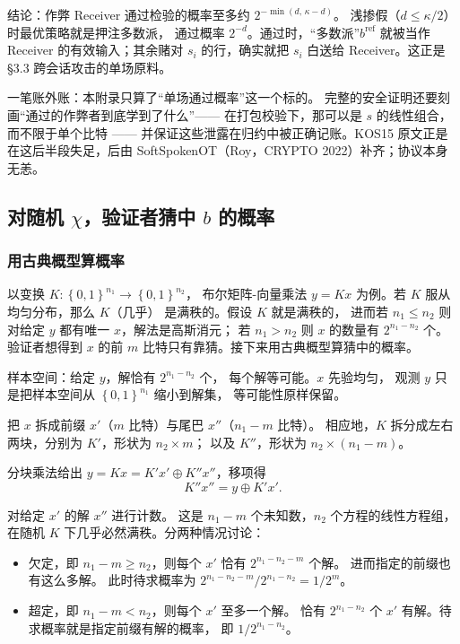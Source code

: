 结论：作弊 Receiver 通过检验的概率至多约 $2^{-\min(d,\,\kappa-d)}$。
浅掺假（$d \le \kappa/2$）时最优策略就是押注多数派，
通过概率 $2^{-d}$。通过时，“多数派”$b^{\mathrm{ref}}$ 就被当作
Receiver 的有效输入；其余赌对 $s_i$ 的行，确实就把 $s_i$ 白送给
Receiver。这正是 §3.3 跨会话攻击的单场原料。

一笔账外账：本附录只算了“单场通过概率”这一个标的。
完整的安全证明还要刻画“通过的作弊者到底学到了什么”------
在打包校验下，那可以是 $s$ 的线性组合，而不限于单个比特 ------
并保证这些泄露在归约中被正确记账。KOS15 原文正是在这后半段失足，后由
SoftSpokenOT（Roy，CRYPTO 2022）补齐；协议本身无恙。

\subsection{\texorpdfstring{对随机 $\chi$，验证者猜中 $b$ 的概率}{对随机\textbackslash chi，验证者猜中b的概率}}
\subsubsection{用古典概型算概率}

以变换 $K: \left\{0,1\right\}^{n_1} \rightarrow \left\{0,1\right\}^{n_2}$，
布尔矩阵-向量乘法 $y=Kx$ 为例。若 $K$ 服从均匀分布，那么 $K$（几乎）
是满秩的。假设 $K$ 就是满秩的，
进而若 $n_1\le n_2$ 则对给定 $y$ 都有唯一 $x$，解法是高斯消元；
若 $n_1>n_2$ 则 $x$ 的数量有 $2^{n_1-n_2}$ 个。
验证者想得到 $x$ 的前 $m$ 比特只有靠猜。接下来用古典概型算猜中的概率。

样本空间：给定 $y$，解恰有 $2^{n_1-n_2}$ 个，
每个解等可能。$x$ 先验均匀，
观测 $y$ 只是把样本空间从 $\left\{0,1\right\}^{n_1}$ 缩小到解集，
等可能性原样保留。

把 $x$ 拆成前缀 $x'$（$m$ 比特）与尾巴 $x''$（$n_1 - m$ 比特）。
相应地，$K$ 拆分成左右两块，分别为 $K'$，形状为 $n_2\times m$；
以及 $K''$，形状为 $n_2\times (n_1-m)$。

分块乘法给出 $y = Kx = K'x' \oplus K''x''$，移项得
\begin{equation}\label{eq:02-kos15:19}
K''x'' = y \oplus K'x'.
\end{equation}

对给定 $x'$ 的解 $x''$ 进行计数。
这是 $n_1 - m$ 个未知数，$n_2$ 个方程的线性方程组，
在随机 $K$ 下几乎必然满秩。分两种情况讨论：

\begin{itemize}

\item
  欠定，即 $n_1 - m \ge n_2$，则每个 $x'$ 恰有 $2^{n_1-n_2-m}$ 个解。
  进而指定的前缀也有这么多解。
  此时待求概率为 $2^{n_1-n_2-m}/2^{n_1-n_2}$$=1/2^m$。
\item
  超定，即 $n_1 - m < n_2$，则每个 $x'$ 至多一个解。
  恰有 $2^{n_1-n_2}$ 个 $x'$ 有解。待求概率就是指定前缀有解的概率，
  即 $1/2^{n_1-n_2}$。
\end{itemize}


